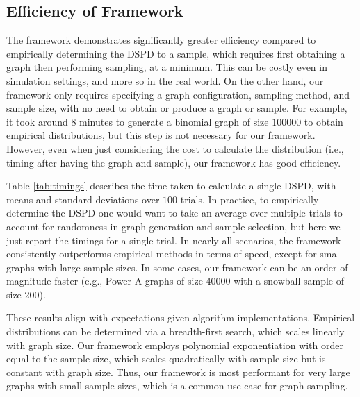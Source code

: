 \subsection{Efficiency of Framework}

The framework demonstrates significantly greater efficiency compared to empirically determining the DSPD to a sample, which requires first obtaining a graph then performing sampling, at a minimum. This can be costly even in simulation settings, and more so in the real world. On the other hand, our framework only requires specifying a graph configuration, sampling method, and sample size, with no need to obtain or produce a graph or sample. For example, it took around 8 minutes to generate a binomial graph of size $100000$ to obtain empirical distributions, but this step is not necessary for our framework. However, even when just considering the cost to calculate the distribution (i.e., timing after having the graph and sample), our framework has good efficiency.

Table \ref{tab:timings} describes the time taken to calculate a single DSPD, with means and standard deviations over $100$ trials. In practice, to empirically determine the DSPD one would want to take an average over multiple trials to account for randomness in graph generation and sample selection, but here we just report the timings for a single trial. In nearly all scenarios, the framework consistently outperforms empirical methods in terms of speed, except for small graphs with large sample sizes. In some cases, our framework can be an order of magnitude faster (e.g., Power A graphs of size $40000$ with a snowball sample of size $200$). 

These results align with expectations given algorithm implementations. Empirical distributions can be determined via a breadth-first search, which scales linearly with graph size. Our framework employs polynomial exponentiation with order equal to the sample size, which scales quadratically with sample size but is constant with graph size. %
Thus, our framework is most performant for very large graphs with small sample sizes, which is a common use case for graph sampling. 
